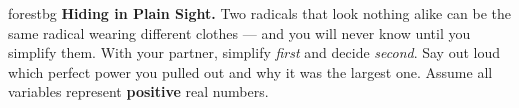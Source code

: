 \documentclass[10pt]{article}
\begin{document}
\namepartnerperiod

\vspace{0.08in}

\begin{headlinebox}{forestbg}
\small\textbf{Hiding in Plain Sight.} Two radicals that look nothing alike can be the same radical
wearing different clothes --- and you will never know until you simplify them. With your partner,
simplify \emph{first} and decide \emph{second}. Say out loud which perfect power you pulled out and
why it was the largest one. Assume all variables represent \textbf{positive} real numbers.
\end{headlinebox}

\vspace{0.06in}
\end{document}
